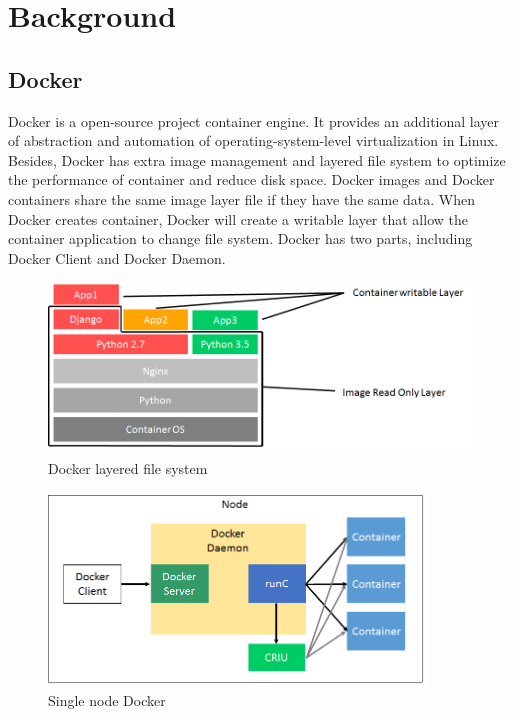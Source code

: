 \chapter{Background}
\label{chap:background}
\section{Docker}
Docker \cite{Docker} is a open-source project container engine. It provides an additional layer of abstraction and automation of operating-system-level virtualization in Linux. Besides, Docker has extra image management and layered file system to optimize the performance of container and reduce disk space. Docker images and Docker containers share the same image layer file if they have the same data. When Docker creates container, Docker will create a writable layer that allow the container application to change file system. Docker has two parts, including Docker Client and Docker Daemon.

\begin{figure}[h]
\begin{center}
\includegraphics[width=15cm]{figure/layered_file_system.png}
\end{center}
\caption{Docker layered file system}
\label{fig:Docker layered file system}
\end{figure}

\begin{figure}[h]
\begin{center}
\includegraphics[width=10cm]{figure/single_node.png}
\end{center}
\caption{Single node Docker}
\end{figure}

